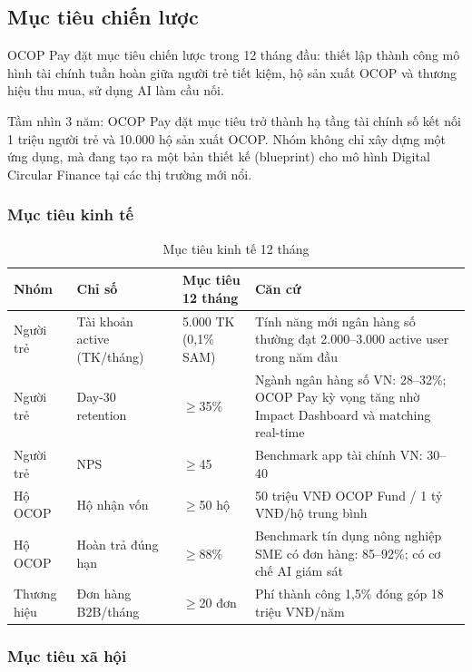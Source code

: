 \documentclass[13pt,a4paper]{extarticle}
\begin{document}
\subsection{Mục tiêu chiến lược}

OCOP Pay đặt mục tiêu chiến lược trong 12 tháng đầu: thiết lập thành công mô hình tài chính tuần hoàn giữa người trẻ tiết kiệm, hộ sản xuất OCOP và thương hiệu thu mua, sử dụng AI làm cầu nối.

Tầm nhìn 3 năm: OCOP Pay đặt mục tiêu trở thành hạ tầng tài chính số kết nối 1 triệu người trẻ và 10.000 hộ sản xuất OCOP. Nhóm không chỉ xây dựng một ứng dụng, mà đang tạo ra một bản thiết kế (blueprint) cho mô hình Digital Circular Finance tại các thị trường mới nổi.

\subsubsection{Mục tiêu kinh tế}

\begin{table}[H]
\centering
\caption{Mục tiêu kinh tế 12 tháng}
\begin{tabular}{|l|p{4.5cm}|p{3cm}|p{4cm}|}
\hline
\textbf{Nhóm} & \textbf{Chỉ số} & \textbf{Mục tiêu 12 tháng} & \textbf{Căn cứ} \\
\hline
Người trẻ & Tài khoản active (TK/tháng) & 5.000 TK (0,1\% SAM) & Tính năng mới ngân hàng số thường đạt 2.000--3.000 active user trong năm đầu \\
\hline
Người trẻ & Day-30 retention & $\geq$35\% & Ngành ngân hàng số VN: 28--32\%; OCOP Pay kỳ vọng tăng nhờ Impact Dashboard và matching real-time \\
\hline
Người trẻ & NPS & $\geq$45 & Benchmark app tài chính VN: 30--40 \\
\hline
Hộ OCOP & Hộ nhận vốn & $\geq$50 hộ & 50 triệu VNĐ OCOP Fund / 1 tỷ VNĐ/hộ trung bình \\
\hline
Hộ OCOP & Hoàn trả đúng hạn & $\geq$88\% & Benchmark tín dụng nông nghiệp SME có đơn hàng: 85--92\%; có cơ chế AI giám sát \\
\hline
Thương hiệu & Đơn hàng B2B/tháng & $\geq$20 đơn & Phí thành công 1,5\% đóng góp 18 triệu VNĐ/năm \\
\hline
\end{tabular}
\end{table}

\subsubsection{Mục tiêu xã hội}
\end{document}
